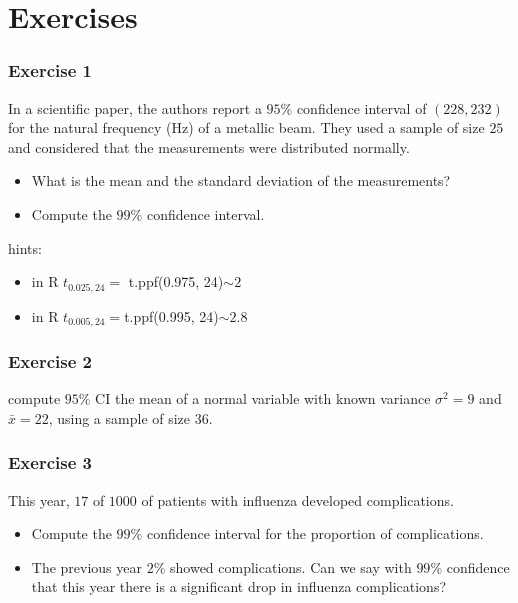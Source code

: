 \documentclass[
]{book}
\begin{document}
\hypertarget{exercises-11}{%
\section{Exercises}\label{exercises-11}}

\hypertarget{exercise-1-10}{%
\subsubsection{Exercise 1}\label{exercise-1-10}}

In a scientific paper, the authors report a \(95\%\) confidence interval of \((228, 232)\) for the natural frequency (Hz) of a metallic beam. They used a sample of size \(25\) and considered that the measurements were distributed normally.

\begin{itemize}
\item
  What is the mean and the standard deviation of the measurements?
\item
  Compute the \(99\%\) confidence interval.
\end{itemize}

hints:

\begin{itemize}
\item
  in R \(t_{0.025, 24}=\) t.ppf(0.975, 24)\(\sim 2\)
\item
  in R \(t_{0.005, 24}=\)t.ppf(0.995, 24)\(\sim 2.8\)
\end{itemize}

\hypertarget{exercise-2-10}{%
\subsubsection{Exercise 2}\label{exercise-2-10}}

compute \(95\%\) CI the mean of a normal variable with known variance \(\sigma^2=9\) and \(\bar{x}=22\), using a sample of size \(36\).

\hypertarget{exercise-3-7}{%
\subsubsection{Exercise 3}\label{exercise-3-7}}

This year, \(17\) of \(1000\) of patients with influenza developed complications.

\begin{itemize}
\item
  Compute the \(99\%\) confidence interval for the proportion of complications.
\item
  The previous year \(2\%\) showed complications. Can we say with \(99\%\) confidence that this year there is a significant drop in influenza complications?
\end{itemize}
\end{document}
